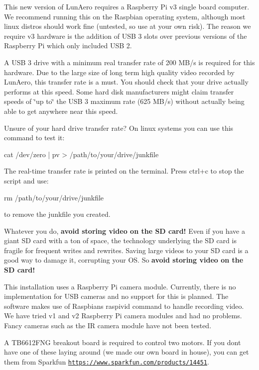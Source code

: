 This new version of Lun\+Aero requires a Raspberry Pi v3 single board computer. We recommend running this on the Raspbian operating system, although most linux distros should work fine (untested, so use at your own risk). The reason we require v3 hardware is the addition of U\+SB 3 slots over previous versions of the Raspberry Pi which only included U\+SB 2.

A U\+SB 3 drive with a minimum real transfer rate of 200 M\+B/s is required for this hardware. Due to the large size of long term high quality video recorded by Lun\+Aero, this transfer rate is a must. You should check that your drive actually performs at this speed. Some hard disk manufacturers might claim transfer speeds of \char`\"{}up to\char`\"{} the U\+SB 3 maximum rate (625 M\+B/s) without actually being able to get anywhere near this speed.

Unsure of your hard drive transfer rate? On linux systems you can use this command to test it\+: 
\begin{DoxyCode}
cat /dev/zero | pv > /path/to/your/drive/junkfile
\end{DoxyCode}
 The real-\/time transfer rate is printed on the terminal. Press {\ttfamily ctrl}+{\ttfamily c} to stop the script and use\+: 
\begin{DoxyCode}
rm /path/to/your/drive/junkfile
\end{DoxyCode}
 to remove the junkfile you created.

Whatever you do, {\bfseries avoid storing video on the SD card!} Even if you have a giant SD card with a ton of space, the technology underlying the SD card is fragile for frequent writes and rewrites. Saving large videos to your SD card is a good way to damage it, corrupting your OS. So {\bfseries avoid storing video on the SD card!}

This installation uses a Raspberry Pi camera module. Currently, there is no implementation for U\+SB cameras and no support for this is planned. The software makes use of Raspbian\textquotesingle{}s {\ttfamily raspivid} command to handle recording video. We have tried v1 and v2 Raspberry Pi camera modules and had no problems. Fancy cameras such as the IR camera module have not been tested.

A T\+B6612\+F\+NG breakout board is required to control two motors. If you don\textquotesingle{}t have one of these laying around (we made our own board in house), you can get them from Sparkfun \href{https://www.sparkfun.com/products/14451}{\tt https\+://www.\+sparkfun.\+com/products/14451}.

